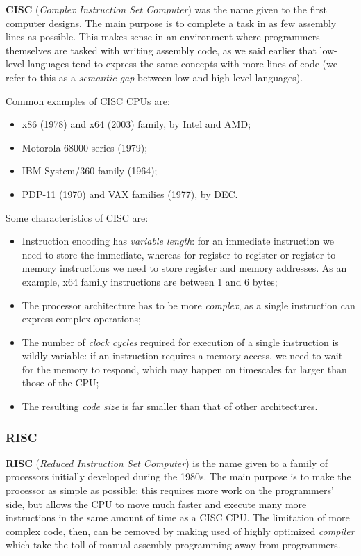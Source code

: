 \documentclass[a4paper,11pt]{article}
\begin{document}
\textbf{CISC} (\textit{Complex Instruction Set Computer}) was the name given to the first computer designs.
The main purpose is to complete a task in as few assembly lines as possible.
This makes sense in an environment where programmers themselves are tasked with writing assembly code, as we said earlier that low-level languages tend to express the same concepts with more lines of code (we refer to this as a \textit{semantic gap} between low and high-level languages).

Common examples of CISC CPUs are:
\begin{itemize}
	\item x86 (1978) and x64 (2003) family, by Intel and AMD;
	\item Motorola 68000 series (1979);
	\item IBM System/360 family (1964);
	\item PDP-11 (1970) and VAX families (1977), by DEC.
\end{itemize}

Some characteristics of CISC are:
\begin{itemize}
	\item Instruction encoding has \textit{variable length}: for an immediate instruction we need to store the immediate, whereas for register to register or register to memory instructions we need to store register and memory addresses. As an example, x64 family instructions are between 1 and 6 bytes;
	\item The processor architecture has to be more \textit{complex}, as a single instruction can express complex operations;
	\item The number of \textit{clock cycles} required for execution of a single instruction is wildly variable: if an instruction requires a memory access, we need to wait for the memory to respond, which may happen on timescales far larger than those of the CPU;
	\item The resulting \textit{code size} is far smaller than that of other architectures.
\end{itemize}

\subsubsection{RISC}

\textbf{RISC} (\textit{Reduced Instruction Set Computer}) is the name given to a family of processors initially developed during the 1980s.
The main purpose is to make the processor as simple as possible: this requires more work on the programmers' side, but allows the CPU to move much faster and execute many more instructions in the same amount of time as a CISC CPU.
The limitation of more complex code, then, can be removed by making used of highly optimized \textit{compiler} which take the toll of manual assembly programming away from programmers.
\end{document}
